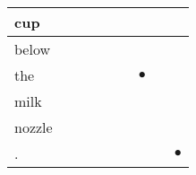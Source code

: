 \documentclass[landscape]{article}
\newcommand{\ssp}{\hspace{2pt}}
\newcommand{\mex}{\cellcolor{g}$\bullet$}
\begin{document}
\begin{tabular}{|l|p{10pt}|p{10pt}|p{10pt}|p{10pt}|p{10pt}|p{10pt}|p{10pt}|p{10pt}|}
\hline
\ssp cup \ssp&\hspace{2pt}&\hspace{2pt}&\hspace{2pt}&\hspace{2pt}&\hspace{2pt}&\hspace{2pt}&\hspace{2pt}&\hspace{2pt}\\
\hline
\ssp below \ssp&\hspace{2pt}&\hspace{2pt}&\hspace{2pt}&\hspace{2pt}&\hspace{2pt}&\hspace{2pt}&\hspace{2pt}&\hspace{2pt}\\
\hline
\ssp \cellcolor{ref5}the \ssp&\hspace{2pt}&\hspace{2pt}&\hspace{2pt}&\hspace{2pt}&\hspace{2pt}&\hspace{2pt}\mex&\hspace{2pt}&\hspace{2pt}\\
\hline
\ssp milk \ssp&\hspace{2pt}&\hspace{2pt}&\hspace{2pt}&\hspace{2pt}&\hspace{2pt}&\hspace{2pt}&\hspace{2pt}&\hspace{2pt}\\
\hline
\ssp nozzle \ssp&\hspace{2pt}&\hspace{2pt}&\hspace{2pt}&\hspace{2pt}&\hspace{2pt}&\hspace{2pt}&\hspace{2pt}&\hspace{2pt}\\
\hline
\ssp \cellcolor{ref7}. \ssp&\hspace{2pt}&\hspace{2pt}&\hspace{2pt}&\hspace{2pt}&\hspace{2pt}&\hspace{2pt}&\hspace{2pt}&\hspace{2pt}\mex\\
\hline
\end{tabular}
\end{document}
